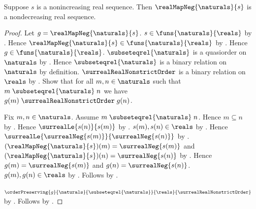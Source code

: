 \begin{proposition}\label{negated_nonincreasing_real_sequence}
    Suppose $s$ is a nonincreasing real sequence.
    Then $\realMapNeg{\naturals}{s}$ is a nondecreasing real sequence.
\end{proposition}
\begin{proof}
    Let $g=\realMapNeg{\naturals}{s}$.
    $s\in\funs{\naturals}{\reals}$ by
        .
    Hence $\realMapNeg{\naturals}{s}\in\funs{\naturals}{\reals}$ by
        .
    Hence $g\in\funs{\naturals}{\reals}$.
    $\subseteqrel{\naturals}$ is a quasiorder on $\naturals$ by
        .
    Hence $\subseteqrel{\naturals}$ is a binary relation on
        $\naturals$ by definition.
    $\surrealRealNonstrictOrder$ is a binary relation on $\reals$ by
        .
    Show that for all $m,n\in\naturals$ such that
        $m\mathrel{\subseteqrel{\naturals}}n$ we have
        $g(m)\mathrel{\surrealRealNonstrictOrder}g(n)$.
    \begin{subproof}
        Fix $m,n\in\naturals$.
        Assume $m\mathrel{\subseteqrel{\naturals}}n$.
        Hence $m\subseteq n$ by .
        Hence $\surrealLe{s(n)}{s(m)}$ by
            .
        $s(m),s(n)\in\reals$ by .
        Hence $\surrealLe{\surrealNeg{s(m)}}{\surrealNeg{s(n)}}$ by
            .
        $(\realMapNeg{\naturals}{s})(m)=\surrealNeg{s(m)}$ and
            $(\realMapNeg{\naturals}{s})(n)=\surrealNeg{s(n)}$ by
            .
        Hence $g(m)=\surrealNeg{s(m)}$ and
            $g(n)=\surrealNeg{s(n)}$.
        $g(m),g(n)\in\reals$ by .
        Follows by .
    \end{subproof}
    $\orderPreserving{g}{\naturals}{\subseteqrel{\naturals}}
        {\reals}{\surrealRealNonstrictOrder}$ by
        .
    Follows by .
\end{proof}

